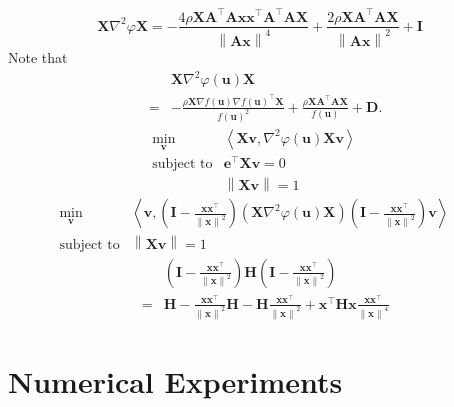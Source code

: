 \documentclass{article}
\newcommand{\x}{\mathbf{x}}
\newcommand{\A}{\mathbf{A}}
\newcommand{\0}{\textbf{0}}
\newcommand{\e}{\mathbf{e}}
\newcommand{\n}{\nabla}
\newcommand{\X}{\mathbf{X}}
\newcommand{\I}{\mathbf{I}}
\newcommand{\tmH}{\mathbf{H}}
\newcommand{\tmu}{\mathbf{u}}
\newcommand{\tmv}{\mathbf{v}}
\newcommand{\D}{\mathbf{D}}
\begin{document}
\[ \X \n^2 \varphi \X = - \frac{4 \rho \X \A^{\top} \A \x \x^{\top} \A^{\top}
   \A \X}{\left\| \A \x \right\|^4} + \frac{2 \rho \X \A^{\top} \A \X}{\left\|
   \A \x \right\|^2} + \I \]
Note that
\begin{eqnarray*}
  &  & \X \n^2 \varphi \left( \tmu \right) \X\\
  & = & - \frac{\rho \X \n f \left( \tmu \right) \n f \left( \tmu
  \right)^{\top} \X}{f \left( \tmu \right)^2} + \frac{\rho \X \A^{\top} \A
  \X}{f \left( \tmu \right)} + \D .
\end{eqnarray*}
\begin{eqnarray*}
  \min_{\tmv} & \left\langle \X \tmv, \n^2 \varphi \left( \tmu \right) \X \tmv
  \right\rangle & \\
  \text{subject to} & \e^{\top} \X \tmv = 0 & \\
  & \left\| \X \tmv \right\| = 1 & 
\end{eqnarray*}
\begin{eqnarray*}
  \min_{\tmv} & \left\langle \tmv, \left( \I - \frac{\x \x^{\top}}{\left\| \x
  \right\|^2} \right) \left( \X \n^2 \varphi \left( \tmu \right) \X \right)
  \left( \I - \frac{\x \x^{\top}}{\left\| \x \right\|^2} \right) \tmv
  \right\rangle & \\
  \text{subject to} & \left\| \X \tmv \right\| = 1 & 
\end{eqnarray*}
\begin{eqnarray*}
  &  & \left( \I - \frac{\x \x^{\top}}{\left\| \x \right\|^2} \right) \tmH
  \left( \I - \frac{\x \x^{\top}}{\left\| \x \right\|^2} \right)\\
  & = & \tmH - \frac{\x \x^{\top}}{\left\| \x \right\|^2} \tmH - \tmH
  \frac{\x \x^{\top}}{\left\| \x \right\|^2} + \x^{\top} \tmH \x \frac{\x
  \x^{\top}}{\left\| \x \right\|^4}
\end{eqnarray*}

\section{Numerical Experiments}
\end{document}
